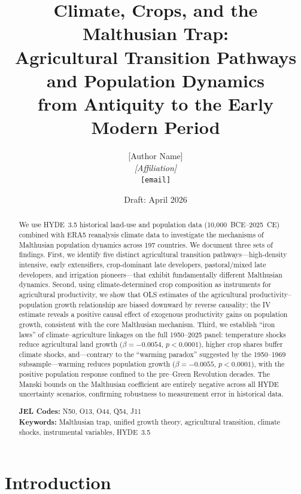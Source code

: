 \documentclass[12pt,letterpaper]{article}
\title{%
  Climate, Crops, and the Malthusian Trap:\\
  Agricultural Transition Pathways and Population Dynamics\\
  from Antiquity to the Early Modern Period%
}
\author{
  [Author Name]\\
  \textit{[Affiliation]}\\
  \texttt{[email]}
}
\date{Draft: April 2026}
\begin{document}
\maketitle

\begin{abstract}
\noindent
We use HYDE~3.5 historical land-use and population data (10,000~BCE--2025~CE) combined with ERA5 reanalysis climate data to investigate the mechanisms of Malthusian population dynamics across 197 countries. We document three sets of findings. First, we identify five distinct agricultural transition pathways---high-density intensive, early extensifiers, crop-dominant late developers, pastoral/mixed late developers, and irrigation pioneers---that exhibit fundamentally different Malthusian dynamics. Second, using climate-determined crop composition as instruments for agricultural productivity, we show that OLS estimates of the agricultural productivity--population growth relationship are biased downward by reverse causality; the IV estimate reveals a positive causal effect of exogenous productivity gains on population growth, consistent with the core Malthusian mechanism. Third, we establish ``iron laws'' of climate--agriculture linkages on the full 1950--2025 panel: temperature shocks reduce agricultural land growth ($\beta = -0.0054$, $p < 0.0001$), higher crop shares buffer climate shocks, and---contrary to the ``warming paradox'' suggested by the 1950--1969 subsample---warming reduces population growth ($\beta = -0.0055$, $p < 0.0001$), with the positive population response confined to the pre--Green Revolution decades. The Manski bounds on the Malthusian coefficient are entirely negative across all HYDE uncertainty scenarios, confirming robustness to measurement error in historical data.

\vspace{0.5em}
\noindent\textbf{JEL Codes:} N50, O13, O44, Q54, J11\\
\textbf{Keywords:} Malthusian trap, unified growth theory, agricultural transition, climate shocks, instrumental variables, HYDE~3.5
\end{abstract}

\newpage
\tableofcontents
\newpage

\section{Introduction}
\end{document}
